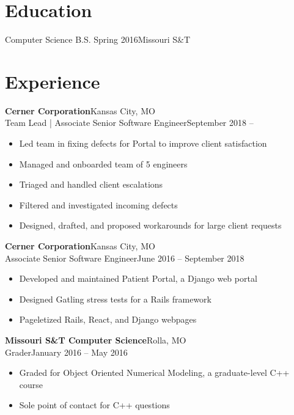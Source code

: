 \documentclass[margin]{res}
\begin{document}
  \begin{resume}
    \section{Education}
      Computer Science B.S. Spring 2016\hfill Missouri S\&T\\
    \section{Experience}
       \textbf{Cerner Corporation}\hfill Kansas City, MO\\
         Team Lead | Associate Senior Software Engineer\hfill September 2018 --
         \begin{itemize} \itemsep -1pt  %
            \item Led team in fixing defects for Portal to improve client satisfaction
            \item Managed and onboarded team of 5 engineers
            \item Triaged and handled client escalations
            \item Filtered and investigated incoming defects
            \item Designed, drafted, and proposed workarounds for large client requests
         \end{itemize}

       \textbf{Cerner Corporation}\hfill Kansas City, MO\\
         Associate Senior Software Engineer\hfill June 2016 -- September 2018
         \begin{itemize} \itemsep -1pt  %
            \item Developed and maintained Patient Portal, a Django web portal
            \item Designed Gatling stress tests for a Rails framework
            \item Pageletized Rails, React, and Django webpages
         \end{itemize}

      \textbf{Missouri S\&T Computer Science}\hfill Rolla, MO\\
         Grader\hfill January 2016 -- May 2016
         \begin{itemize} \itemsep -1pt  %
           \item Graded for Object Oriented Numerical Modeling, a graduate-level C++ course
           \item Sole point of contact for C++ questions
         \end{itemize}


\end{resume}
\end{document}
